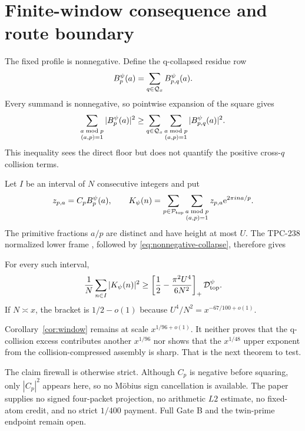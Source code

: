 \section{Finite-window consequence and route boundary}
\label{sec:boundary}

The fixed profile is nonnegative.  Define the q-collapsed residue row
\[
 B_p^\psi(a)=\sum_{q\in\mathcal{Q}_x}B_{p,q}^\psi(a).
\]
Every summand is nonnegative, so pointwise expansion of the square gives
\begin{equation}
 \sum_{\substack{a\bmod p\\(a,p)=1}}|B_p^\psi(a)|^2
 \geq
 \sum_{q\in\mathcal{Q}_x}
 \sum_{\substack{a\bmod p\\(a,p)=1}}|B_{p,q}^\psi(a)|^2.
 \label{eq:nonnegative-collapse}
\end{equation}
This inequality sees the direct floor but does not quantify the positive
cross-$q$ collision terms.

Let $I$ be an interval of $N$ consecutive integers and put
\[
 z_{p,a}=C_pB_p^\psi(a),\qquad
 K_\psi(n)=\sum_{p\in\mathcal{P}_{\mathrm{top}}}
 \sum_{\substack{a\bmod p\\(a,p)=1}}z_{p,a}\mathrm{e}^{2\pi ina/p}.
\]
The primitive fractions $a/p$ are distinct and have height at most $U$.
The TPC-238 normalized lower frame \cite{WangTPC238}, followed by
\eqref{eq:nonnegative-collapse}, therefore gives
\begin{corollary}
\label{cor:window}
For every such interval,
\begin{equation}
 \frac1N\sum_{n\in I}|K_\psi(n)|^2
 \geq
 \left[\frac12-\frac{\pi^2U^4}{6N^2}\right]_{+}\mathcal{D}_{\mathrm{top}}^{\psi}.
 \label{eq:window-lower}
\end{equation}
If $N\asymp x$, the bracket is $1/2-o(1)$ because
$U^4/N^2=x^{-67/100+o(1)}$.
\end{corollary}

Corollary~\ref{cor:window} remains at scale $x^{1/96+o(1)}$.  It neither
proves that the q-collision excess contributes another $x^{1/96}$ nor shows
that the $x^{1/48}$ upper exponent from the collision-compressed assembly is
sharp.  That is the next theorem to test.

The claim firewall is otherwise strict.  Although $C_p$ is negative before
squaring, only $|C_p|^2$ appears here, so no M\"obius sign cancellation is
available.  The paper supplies no signed four-packet projection, no arithmetic
$L2$ estimate, no fixed-atom credit, and no strict $1/400$ payment.  Full Gate
B and the twin-prime endpoint remain open.
